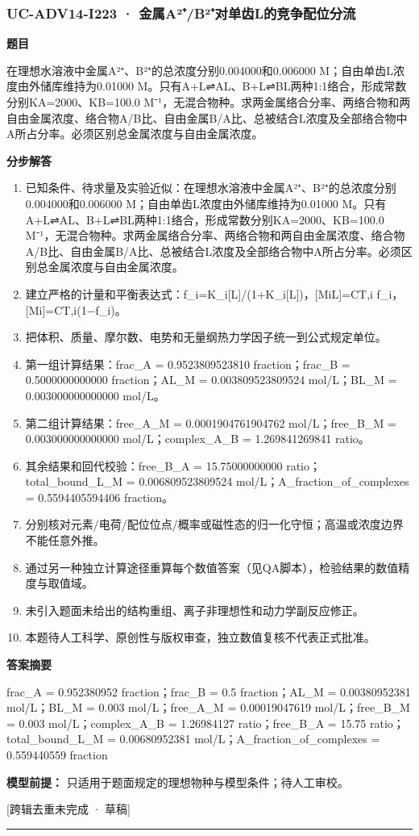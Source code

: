 \documentclass[UTF8,11pt,a4paper]{ctexart}
\begin{document}
\subsubsection*{UC-ADV14-I223 · 金属A²⁺/B²⁺对单齿L的竞争配位分流}
\noindent\textbf{题目}\par
在理想水溶液中金属A²⁺、B²⁺的总浓度分别0.004000和0.006000 M；自由单齿L浓度由外储库维持为0.01000 M。只有A+L⇌AL、B+L⇌BL两种1:1络合，形成常数分别KA=2000、KB=100.0 M⁻¹，无混合物种。求两金属络合分率、两络合物和两自由金属浓度、络合物A/B比、自由金属B/A比、总被结合L浓度及全部络合物中A所占分率。必须区别总金属浓度与自由金属浓度。\par
\medskip\noindent\textbf{分步解答}
\begin{enumerate}
\item 已知条件、待求量及实验近似：在理想水溶液中金属A²⁺、B²⁺的总浓度分别0.004000和0.006000 M；自由单齿L浓度由外储库维持为0.01000 M。只有A+L⇌AL、B+L⇌BL两种1:1络合，形成常数分别KA=2000、KB=100.0 M⁻¹，无混合物种。求两金属络合分率、两络合物和两自由金属浓度、络合物A/B比、自由金属B/A比、总被结合L浓度及全部络合物中A所占分率。必须区别总金属浓度与自由金属浓度。
\item 建立严格的计量和平衡表达式：f\_i=K\_i[L]/(1+K\_i[L])，[MiL]=CT,i f\_i，[Mi]=CT,i(1−f\_i)。
\item 把体积、质量、摩尔数、电势和无量纲热力学因子统一到公式规定单位。
\item 第一组计算结果：frac\_A = 0.9523809523810 fraction；frac\_B = 0.5000000000000 fraction；AL\_M = 0.003809523809524 mol/L；BL\_M = 0.003000000000000 mol/L。
\item 第二组计算结果：free\_A\_M = 0.0001904761904762 mol/L；free\_B\_M = 0.003000000000000 mol/L；complex\_A\_B = 1.269841269841 ratio。
\item 其余结果和回代校验：free\_B\_A = 15.75000000000 ratio；total\_bound\_L\_M = 0.006809523809524 mol/L；A\_fraction\_of\_complexes = 0.5594405594406 fraction。
\item 分别核对元素/电荷/配位位点/概率或磁性态的归一化守恒；高温或浓度边界不能任意外推。
\item 通过另一种独立计算途径重算每个数值答案（见QA脚本），检验结果的数值精度与取值域。
\item 未引入题面未给出的结构重组、离子非理想性和动力学副反应修正。
\item 本题待人工科学、原创性与版权审查，独立数值复核不代表正式批准。
\end{enumerate}
\noindent\textbf{答案摘要}\par
frac\_A = 0.952380952 fraction；frac\_B = 0.5 fraction；AL\_M = 0.00380952381 mol/L；BL\_M = 0.003 mol/L；free\_A\_M = 0.00019047619 mol/L；free\_B\_M = 0.003 mol/L；complex\_A\_B = 1.26984127 ratio；free\_B\_A = 15.75 ratio；total\_bound\_L\_M = 0.00680952381 mol/L；A\_fraction\_of\_complexes = 0.559440559 fraction\par
\noindent\textbf{模型前提：}
只适用于题面规定的理想物种与模型条件；待人工审校。\par
\noindent\textcolor{red!65!black}{[跨辑去重未完成 · 草稿]} \par
\medskip\hrule\medskip
{}
\end{document}
